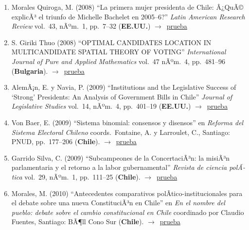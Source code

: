 \documentclass[12 pt, letter]{article}
\newenvironment{CitasMiTrabajo}{
    \begin{footnotesize}
    \begin{enumerate}[label={\footnotesize\emph{cita~\arabic*}},ref=\arabic*] %
        \setlength{\itemsep}{.1\itemsep}
        \setlength{\parskip}{.1\parskip}
    }{\end{enumerate}\end{footnotesize}}
\begin{document}
\begin{CitasMiTrabajo}
        \item Morales Quiroga, M. (2008)
        ``La primera mujer presidenta de Chile: Â¿QuÃ© explicÃ³ el triunfo de Michelle Bachelet en 2005--6?''
        \emph{Latin American Research Review} vol.\ 43, nÃºm.\ 1, pp.\ 7--32 (\textbf{EE.UU.}) $\rightarrow$~\href{http://ericmagar.com/cv/cites/mrs/morales2008larr.excerpt.pdf}{prueba}

        \item S. Giriki Thuo (2008)
        ``OPTIMAL CANDIDATES LOCATION IN MULTICANDIDATE SPATIAL THEORY OF VOTING''
        \emph{International Journal of Pure and Applied Mathematics} vol.\ 47 nÃºm.\ 4, pp.\ 481--96 (\textbf{Bulgaria}). $\rightarrow$~\href{http://ericmagar.com/cv/cites/mrs/thuoOptimalLocation2008ijpam.pdf}{prueba}

        \item AlemÃ¡n, E. y Navia, P. (2009)
        ``Institutions and the Legislative Success of `Strong'
        Presidents: An Analysis of Government Bills in Chile''
        \emph{Journal of Legislative Studies}
        vol.\ 14, nÃºm.\ 4, pp.\ 401--19 (\textbf{EE.UU.}) $\rightarrow$~\href{http://ericmagar.com/cv/cites/mrs/alemanNavia.pdf}{prueba}

        \item Von Baer, E. (2009)
        ``Sistema binomial: consensos y disensos'' en
        \emph{Reforma del Sistema Electoral Chileno} coords.\ Fontaine, A. y Larroulet, C., Santiago: PNUD, pp.\ 177--206 (\textbf{Chile}). $\rightarrow$~\href{http://ericmagar.com/cv/cites/mrs/vonBaer2009.pdf}{prueba}

        \item Garrido Silva, C. (2009)
        ``Subcampeones de la ConcertaciÃ³n: la misiÃ³n parlamentaria y el retorno a la labor gubernamental''
        \emph{Revista de ciencia polÃ­tica}
        vol.\ 29, nÃºm.\ 1, pp.\ 111--25 (\textbf{Chile}). $\rightarrow$~\href{http://ericmagar.com/cv/cites/mrs/garrido2009rcp.pdf}{prueba}

        \item Morales, M. (2010)
        ``Antecedentes comparativos polÃ­tico-institucionales para el debate sobre una nueva ConstituciÃ³n en Chile''
        en \emph{En el nombre del pueblo: debate sobre el cambio constitucional en Chile} coordinado por Claudio Fuentes, Santiago: BÃ¶ll Cono Sur (\textbf{Chile}). $\rightarrow$~\href{http://ericmagar.com/cv/cites/mrs/morales2010.excerpt.pdf}{prueba}


\end{CitasMiTrabajo}
\end{document}
